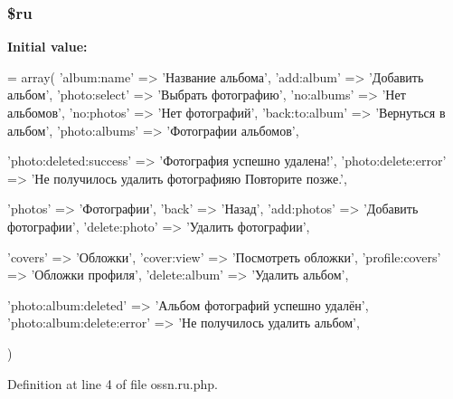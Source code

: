 \subsubsection[{\texorpdfstring{\$ru}{$ru}}]{\setlength{\rightskip}{0pt plus 5cm}\$ru}\hypertarget{components_2_ossn_photos_2locale_2ossn_8ru_8php_aab84a3feda2b0e489cac7cd194e8d726}{}\label{components_2_ossn_photos_2locale_2ossn_8ru_8php_aab84a3feda2b0e489cac7cd194e8d726}
{\bfseries Initial value\+:}
\begin{DoxyCode}
= array(
    \textcolor{stringliteral}{'album:name'} => \textcolor{stringliteral}{'Название альбома'},
    \textcolor{stringliteral}{'add:album'} => \textcolor{stringliteral}{'Добавить альбом'},
    \textcolor{stringliteral}{'photo:select'} => \textcolor{stringliteral}{'Выбрать фотографию'},
    \textcolor{stringliteral}{'no:albums'} => \textcolor{stringliteral}{'Нет альбомов'},
    \textcolor{stringliteral}{'no:photos'} => \textcolor{stringliteral}{'Нет фотографий'},
    \textcolor{stringliteral}{'back:to:album'} => \textcolor{stringliteral}{'Вернуться в альбом'},
    \textcolor{stringliteral}{'photo:albums'} => \textcolor{stringliteral}{'Фотографии альбомов'},
    
    \textcolor{stringliteral}{'photo:deleted:success'} => \textcolor{stringliteral}{'Фотография успешно удалена!'},
    \textcolor{stringliteral}{'photo:delete:error'} => \textcolor{stringliteral}{'Не получилось удалить фотографияю Повторите позже.'},
    
    \textcolor{stringliteral}{'photos'} => \textcolor{stringliteral}{'Фотографии'},
    \textcolor{stringliteral}{'back'} => \textcolor{stringliteral}{'Назад'},
    \textcolor{stringliteral}{'add:photos'} => \textcolor{stringliteral}{'Добавить фотографии'},
    \textcolor{stringliteral}{'delete:photo'} => \textcolor{stringliteral}{'Удалить фотографии'},
    
    \textcolor{stringliteral}{'covers'} => \textcolor{stringliteral}{'Обложки'},
    \textcolor{stringliteral}{'cover:view'} => \textcolor{stringliteral}{'Посмотреть обложки'},
    \textcolor{stringliteral}{'profile:covers'} => \textcolor{stringliteral}{'Обложки профиля'},
    \textcolor{stringliteral}{'delete:album'} => \textcolor{stringliteral}{'Удалить альбом'},
    
    \textcolor{stringliteral}{'photo:album:deleted'} => \textcolor{stringliteral}{'Альбом фотографий успешно удалён'},
    \textcolor{stringliteral}{'photo:album:delete:error'} => \textcolor{stringliteral}{'Не получилось удалить альбом'},
    

)
\end{DoxyCode}


Definition at line 4 of file ossn.\+ru.\+php.

